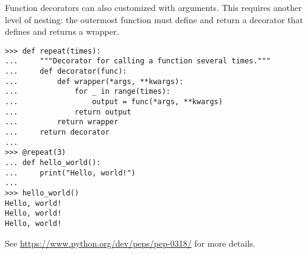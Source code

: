 Function decorators can also customized with arguments.
This requires another level of nesting: the outermost function must define and return a decorator that defines and returns a wrapper.

\begin{lstlisting}
>>> def repeat(times):
...     """Decorator for calling a function several times."""
...     def decorator(func):
...         def wrapper(*args, **kwargs):
...             for _ in range(times):
...                 output = func(*args, **kwargs)
...             return output
...         return wrapper
...     return decorator
...
>>> @repeat(3)
... def hello_world():
...     print("Hello, world!")
...
>>> hello_world()
Hello, world!
Hello, world!
Hello, world!
\end{lstlisting}

See \url{https://www.python.org/dev/peps/pep-0318/} for more details.

\begin{comment} %
Decorating a function can overwrite the original function's docstring.
To remedy this problem, the \li{functools} module includes a decorator for wrappers.

\begin{lstlisting}
>>> from functools import wraps

>>> def typewriter(func):
...     """Decorator for printing the type of output a function returns"""
...     @wraps(func)                            # Add the @wraps tag.
...     def wrapper(*args, **kwargs):
...         output = func(*args, **kwargs)
...         print("output type:", type(output))
...         return output
...     return wrapper
...
>>> def repeat(times=2):
...     """Decorator for calling a function several times."""
...     def decorator(func):
...         @wraps(func)                        # Add the @wraps tag.
...         def wrapper(*args, **kwargs):
...             for _ in range(times):
...                 output = func(*args, **kwargs)
...             return output
...         return wrapper
...     return decorator
\end{lstlisting}
\end{comment}
